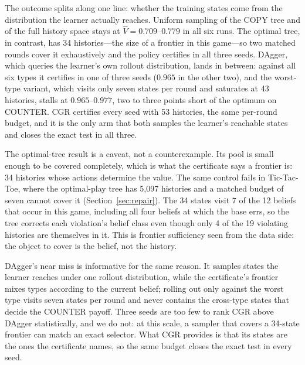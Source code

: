 \documentclass[conference]{IEEEtran}
\begin{document}
The outcome splits along one line: whether the training states come from the distribution the learner actually reaches. Uniform sampling of the COPY tree and of the full history space stays at $\hat V=0.709$--$0.779$ in all six runs. The optimal tree, in contrast, has 34 histories---the size of a frontier in this game---so two matched rounds cover it exhaustively and the policy certifies in all three seeds. DAgger, which queries the learner's own rollout distribution, lands in between: against all six types it certifies in one of three seeds ($0.965$ in the other two), and the worst-type variant, which visits only seven states per round and saturates at 43 histories, stalls at $0.965$--$0.977$, two to three points short of the optimum on COUNTER. CGR certifies every seed with 53 histories, the same per-round budget, and it is the only arm that both samples the learner's reachable states and closes the exact test in all three.

The optimal-tree result is a caveat, not a counterexample. Its pool is small enough to be covered completely, which is what the certificate says a frontier is: 34 histories whose actions determine the value. The same control fails in Tic-Tac-Toe, where the optimal-play tree has 5{,}097 histories and a matched budget of seven cannot cover it (Section~\ref{sec:repair}). The 34 states visit 7 of the 12 beliefs that occur in this game, including all four beliefs at which the base errs, so the tree corrects each violation's belief class even though only 4 of the 19 violating histories are themselves in it. This is frontier sufficiency seen from the data side: the object to cover is the belief, not the history.

DAgger's near miss is informative for the same reason. It samples states the learner reaches under one rollout distribution, while the certificate's frontier mixes types according to the current belief; rolling out only against the worst type visits seven states per round and never contains the cross-type states that decide the COUNTER payoff. Three seeds are too few to rank CGR above DAgger statistically, and we do not: at this scale, a sampler that covers a 34-state frontier can match an exact selector. What CGR provides is that its states are the ones the certificate names, so the same budget closes the exact test in every seed.
\end{document}
